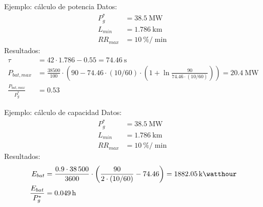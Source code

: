 \documentclass[aspectratio=169, usenames,svgnames,dvipsnames]{beamer}
\begin{document}
\begin{frame}[label={sec:org0a95e01}]{Ejemplo: cálculo de potencia}
Datos:
\begin{align*}
  P_g^* &= \qty{38.5}{\mega\watt}\\
  L_{min} &= \qty{1.786}{\kilo\meter}\\
  RR_{max} &= \qty{10}{\%\per\min}
\end{align*}
Resultados:
\begin{align*}
  \tau &= 42 \cdot \num{1.786} - \num{0.55} = \qty{74.46}{\second}\\
  P_{bat,max} &= \frac{\num{38500}}{100} \cdot \left(90 - \num{74.46} \cdot (10/60) \cdot \left( 1 + \ln\frac{90}{\num{74.46} \cdot (10/60)}\right) \right) = \qty{20.4}{\mega\watt}\\
  \frac{P_{bat,max}}{P_g^*} &= \num{0.53}
\end{align*}
\end{frame}

\begin{frame}[label={sec:org64149a6}]{Ejemplo: cálculo de capacidad}
Datos:
\begin{align*}
  P_g^* &= \qty{38.5}{\mega\watt}\\
  L_{min} &= \qty{1.786}{\kilo\meter}\\
  RR_{max} &= \qty{10}{\%\per\min}
\end{align*}
Resultados:
\begin{align*}
  E_{bat} &= \frac{\num{0.9} \cdot \num{38500}}{\num{3600}} \cdot \left( \frac{90}{2 \cdot (10/60)} - \num{74.46} \right) = \qty{1882.05}{\kilo\watthour}\\
  \frac{E_{bat}}{P_g^*} &= \qty{0.049}{\hour} 
\end{align*}
\end{frame}
\end{document}
